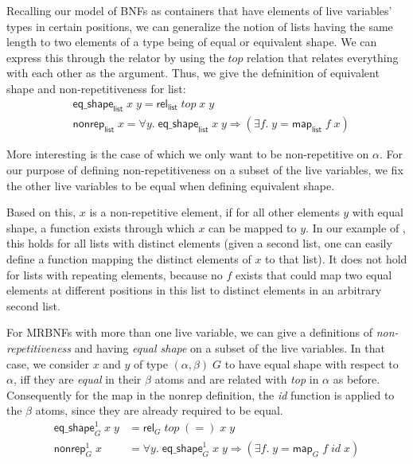     Recalling our model of \ac{BNF}s as containers that have elements of live variables' types in certain positions, we can generalize the notion of lists having the same length to two elements of a type being of equal or equivalent shape. We can express this through the relator by using the $top$ relation that relates everything with each other as the argument. Thus, we give the defninition of equivalent shape and non-repetitiveness for list:
    \begin{align}
      &\textsf{eq\_shape}_\textsf{list}\; x\; y = \textsf{rel}_\textsf{list}\; top\; x\; y\\
      &\textsf{nonrep}_\textsf{list}\; x = \forall y.\; \textsf{eq\_shape}_\textsf{list}\; x\; y \Longrightarrow (\exists f.\; y = \textsf{map}_\textsf{list}\; f\; x)
    \end{align}
    
    More interesting is the case of  which we only want to be non-repetitive on $\alpha$. For our purpose of defining non-repetitiveness on a subset of the live variables, we fix the other live variables to be equal when defining equivalent shape. 

    Based on this, $x$ is a non-repetitive element, if for all other elements $y$ with equal shape, a function exists through which $x$ can be mapped to $y$. In our example of , this holds for all lists with distinct elements (given a second list, one can easily define a function mapping the distinct elements of $x$ to that list). It does not hold for lists with repeating elements, because no $f$ exists that could map two equal elements at different positions in this list to distinct elements in an arbitrary second list.

    For \acp{MRBNF} with more than one live variable, we can give a definitions of \textit{non-repetitiveness} and having \textit{equal shape} on a subset of the live variables. In that case, we consider $x$ and $y$ of type $(\alpha, \beta)\; G$ to have equal shape with respect to $\alpha$, iff they are \textit{equal} in their $\beta$ atoms and are related with \textit{top} in $\alpha$ as before. Consequently for the map in the \textsf{nonrep} definition, the \textit{id} function is applied to the $\beta$ atoms, since they are already required to be equal. 
    \begin{align}
      \textsf{eq\_shape}_G^1\; x\; y &= \textsf{rel}_G\; top\; (=)\; x\; y\\
      \textsf{nonrep}_G^1\; x &= \forall y.\; \textsf{eq\_shape}_G^1\; x\; y \Longrightarrow (\exists f.\; y = \textsf{map}_G\; f\; id\; x)
    \end{align}
    
